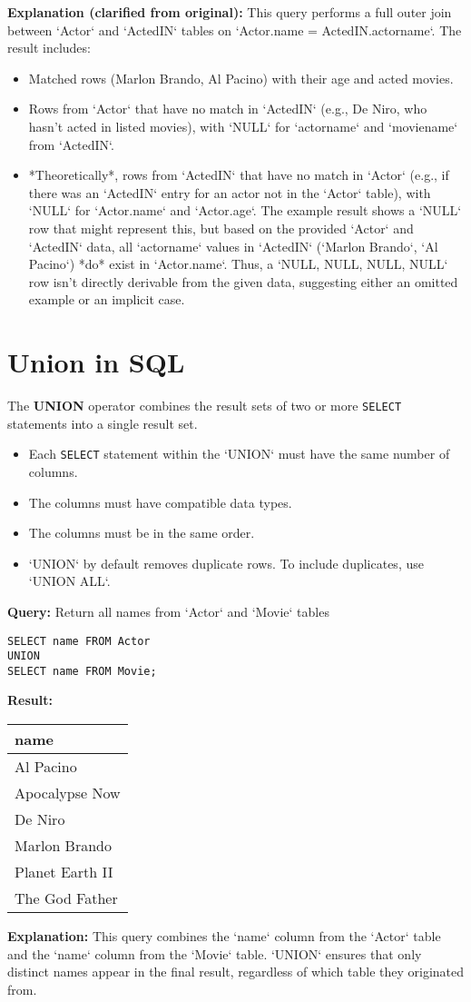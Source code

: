 \documentclass{article}
\begin{document}
\textbf{Explanation (clarified from original):} This query performs a full outer join between `Actor` and `ActedIN` tables on `Actor.name = ActedIN.actorname`. The result includes:
\begin{itemize}
    \item Matched rows (Marlon Brando, Al Pacino) with their age and acted movies.
    \item Rows from `Actor` that have no match in `ActedIN` (e.g., De Niro, who hasn't acted in listed movies), with `NULL` for `actorname` and `moviename` from `ActedIN`.
    \item *Theoretically*, rows from `ActedIN` that have no match in `Actor` (e.g., if there was an `ActedIN` entry for an actor not in the `Actor` table), with `NULL` for `Actor.name` and `Actor.age`. The example result shows a `NULL` row that might represent this, but based on the provided `Actor` and `ActedIN` data, all `actorname` values in `ActedIN` (`Marlon Brando`, `Al Pacino`) *do* exist in `Actor.name`. Thus, a `NULL, NULL, NULL, NULL` row isn't directly derivable from the given data, suggesting either an omitted example or an implicit case.

\end{itemize}

\section*{Union in SQL}
The \textbf{UNION} operator combines the result sets of two or more \texttt{SELECT} statements into a single result set.
\begin{itemize}
    \item Each \texttt{SELECT} statement within the `UNION` must have the same number of columns.
    \item The columns must have compatible data types.
    \item The columns must be in the same order.
    \item `UNION` by default removes duplicate rows. To include duplicates, use `UNION ALL`.
\end{itemize}

\textbf{Query:} Return all names from `Actor` and `Movie` tables 
\begin{lstlisting}
SELECT name FROM Actor
UNION
SELECT name FROM Movie;
\end{lstlisting}

\textbf{Result:}\\ 
\begin{tabular}{|l|}
    \hline
    \textbf{name} \\
    \hline
    Al Pacino \\
    Apocalypse Now \\
    De Niro \\
    Marlon Brando \\
    Planet Earth II \\
    The God Father \\
    \hline
\end{tabular}

\textbf{Explanation:} This query combines the `name` column from the `Actor` table and the `name` column from the `Movie` table. `UNION` ensures that only distinct names appear in the final result, regardless of which table they originated from.
\end{document}

